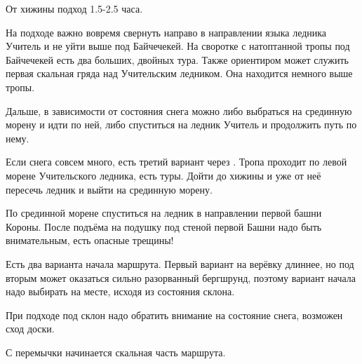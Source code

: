 От хижины \geoLighthouse{} подход 1.5-2.5 часа.


На подходе важно вовремя свернуть направо в направлении языка ледника Учитель и не уйти выше под Байчечекей. На своротке с натоптанной тропы
под Байчечекей есть два больших, двойных тура. Также ориентиром может служить первая скальная гряда над Учительским ледником. Она находится
немного выше тропы.

Дальше, в зависимости от состояния снега можно либо выбраться на срединную морену и идти по ней, либо спуститься на ледник Учитель и
продолжить путь по нему.

Если снега совсем много, есть третий вариант через . Тропа проходит по левой морене Учительского ледника,
есть туры. Дойти до хижины и уже от неё пересечь ледник и выйти на срединную морену.

По срединной морене спуститься на ледник в направлении первой башни Короны. После подъёма на подушку под стеной первой Башни надо быть
внимательным, есть опасные трещины!

Есть два варианта начала маршрута. Первый вариант на верёвку длиннее, но под вторым может оказаться сильно разорванный бергшрунд, поэтому
вариант начала надо выбирать на месте, исходя из состояния склона.

При подходе под склон надо обратить внимание на состояние снега, возможен сход доски.



С перемычки начинается скальная часть маршрута.


